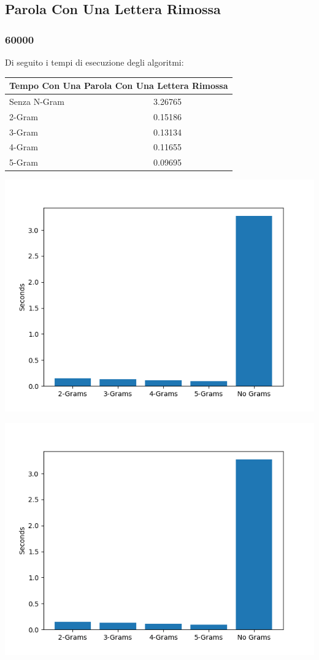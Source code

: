 \documentclass{article}
\begin{document}
\subsection{Parola Con Una Lettera Rimossa}
\subsubsection{60000}
Di seguito i tempi di esecuzione degli algoritmi:
\medskip

\begin{tabular}{ |p{3cm}||p{3.5cm}|  }
 \hline
 \multicolumn{2}{|c|}{Tempo Con Una Parola Con Una Lettera Rimossa} \\
\hline
 Senza N-Gram  &   3.26765\\\hline
 2-Gram &  0.15186    \\\hline
 3-Gram & 0.13134 \\\hline
 4-Gram & 0.11655\\\hline
 5-Gram & 0.09695  \\
 \hline
\end{tabular}

\includegraphics[scale=0.5]{img/LetteraRimossa_60000_parole.png}

\includegraphics[scale=0.5]{img/LetteraRimossa_60000_parole.png}
\end{document}
